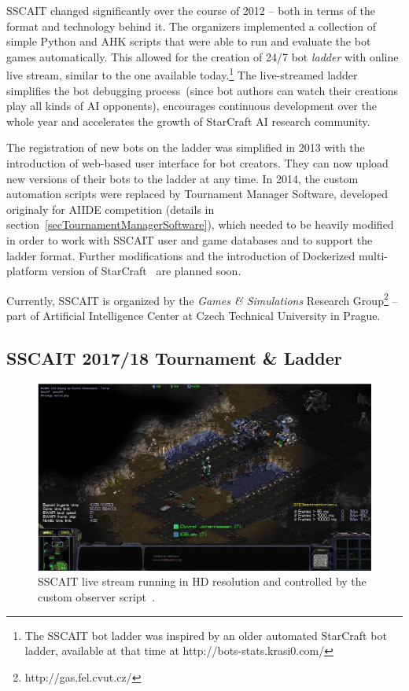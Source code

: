 SSCAIT changed significantly over the course of 2012 -- both in terms of the format and technology behind it. The organizers implemented a collection of simple Python and AHK scripts that were able to run and evaluate the bot games automatically. This allowed for the creation of 24/7 bot {\em ladder} with online live stream, similar to the one available today.\footnote{The SSCAIT bot ladder was inspired by an older automated StarCraft bot ladder, available at that time at http://bots-stats.krasi0.com/} The live-streamed ladder simplifies the bot debugging process~(since bot authors can watch their creations play all kinds of AI opponents), encourages continuous development over the whole year and accelerates the growth of StarCraft AI research community. 

The registration of new bots on the ladder was simplified in 2013 with the introduction of web-based user interface for bot creators. They can now upload new versions of their bots to the ladder at any time. In 2014, the custom automation scripts were replaced by Tournament Manager Software, developed originaly for AIIDE competition (details in section~\ref{secTournamentManagerSoftware}), which needed to be heavily modified in order to work with SSCAIT user and game databases and to support the ladder format. Further modifications and the introduction of Dockerized multi-platform version of StarCraft~\cite{maly2018multi} are planned soon. 

Currently, SSCAIT is organized by the {\em Games \& Simulations} Research Group\footnote{http://gas.fel.cvut.cz/} -- part of Artificial Intelligence Center at Czech Technical University in Prague.

\subsection{SSCAIT 2017/18 Tournament \& Ladder}\label{subsecSSCAITnews}

\begin{figure}[t]
  \centering
  \includegraphics[width=1\columnwidth]{fig/sscait-stream.png}
  \caption{SSCAIT live stream running in HD resolution and controlled by the custom observer script~\cite{mattsson2015automatic}.}
  \label{figSSCAITstream}
\end{figure}

